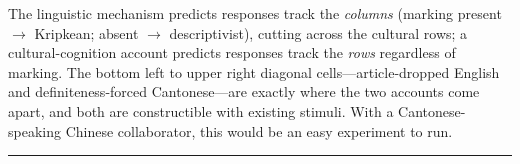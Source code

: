 \documentclass[11pt]{article}
\begin{document}
\noindent The linguistic mechanism predicts responses track the \emph{columns} (marking present $\to$ Kripkean; absent $\to$ descriptivist), cutting across the cultural rows; a cultural-cognition account predicts responses track the \emph{rows} regardless of marking. The bottom left to upper right diagonal cells---article-dropped English and definiteness-forced Cantonese---are exactly where the two accounts come apart, and both are constructible with existing stimuli. With a Cantonese-speaking Chinese collaborator, this would be an easy experiment to run. 


\bigskip
\noindent\rule{0.3\linewidth}{0.4pt}

\smallskip
{}
\end{document}
